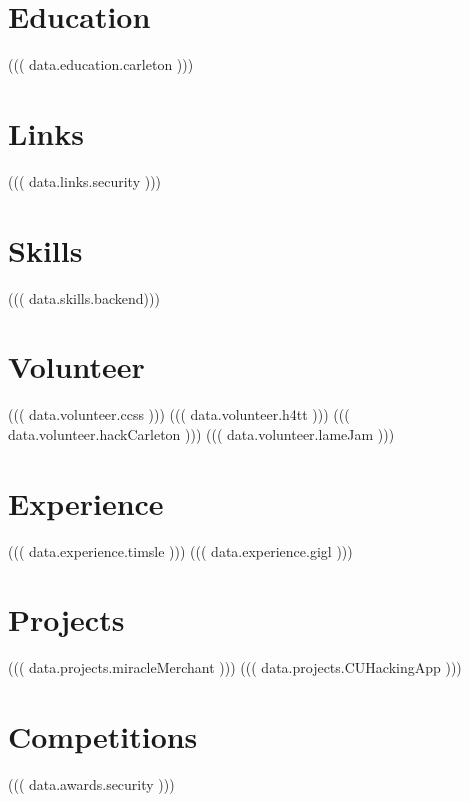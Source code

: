 \documentclass[]{deedy-resume-openfont}
\begin{document}
\vspace*{10pt}


%
%

\begin{minipage}[t]{0.33\textwidth}

\section{Education}

((( data.education.carleton )))

\section{Links}

((( data.links.security )))

\section{Skills}

((( data.skills.backend)))

\section{Volunteer}

((( data.volunteer.ccss )))
((( data.volunteer.h4tt )))
((( data.volunteer.hackCarleton )))
((( data.volunteer.lameJam )))

%
%

\end{minipage} 
\hfill
\begin{minipage}[t]{0.66\textwidth}


\section{Experience}

((( data.experience.timsle )))
((( data.experience.gigl )))

\section{Projects}

((( data.projects.miracleMerchant )))
((( data.projects.CUHackingApp )))

\section{Competitions}

((( data.awards.security )))

\end{minipage}
\end{document}

